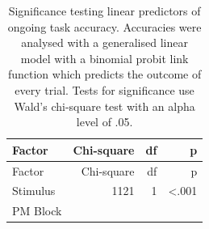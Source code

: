\documentclass[11pt,]{article}
\begin{document}
\begin{longtable}[]{@{}lrrr@{}}
\caption{Significance testing linear predictors of ongoing task
accuracy. Accuracies were analysed with a generalised linear model with
a binomial probit link function which predicts the outcome of every
trial. Tests for significance use Wald's chi-square test with an alpha
level of .05.}\tabularnewline
\toprule
\begin{minipage}[b]{0.36\columnwidth}\raggedright\strut
Factor\strut
\end{minipage} & \begin{minipage}[b]{0.16\columnwidth}\raggedleft\strut
Chi-square\strut
\end{minipage} & \begin{minipage}[b]{0.06\columnwidth}\raggedleft\strut
df\strut
\end{minipage} & \begin{minipage}[b]{0.06\columnwidth}\raggedleft\strut
p\strut
\end{minipage}\tabularnewline
\midrule
\endfirsthead
\toprule
\begin{minipage}[b]{0.36\columnwidth}\raggedright\strut
Factor\strut
\end{minipage} & \begin{minipage}[b]{0.16\columnwidth}\raggedleft\strut
Chi-square\strut
\end{minipage} & \begin{minipage}[b]{0.06\columnwidth}\raggedleft\strut
df\strut
\end{minipage} & \begin{minipage}[b]{0.06\columnwidth}\raggedleft\strut
p\strut
\end{minipage}\tabularnewline
\midrule
\endhead
\begin{minipage}[t]{0.36\columnwidth}\raggedright\strut
Stimulus\strut
\end{minipage} & \begin{minipage}[t]{0.16\columnwidth}\raggedleft\strut
1121\strut
\end{minipage} & \begin{minipage}[t]{0.06\columnwidth}\raggedleft\strut
1\strut
\end{minipage} & \begin{minipage}[t]{0.06\columnwidth}\raggedleft\strut
\textless{}.001\strut
\end{minipage}\tabularnewline
\begin{minipage}[t]{0.36\columnwidth}\raggedright\strut
PM Block\strut
\end{minipage} & \begin{minipage}[t]{0.16\columnwidth}\raggedleft\strut

\end{minipage}
\end{longtable}
\end{document}
